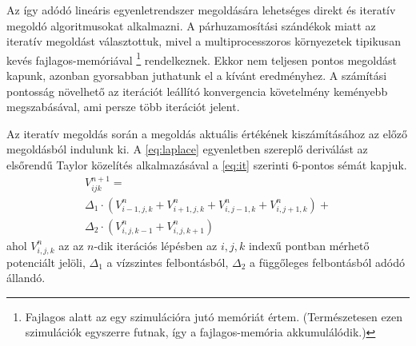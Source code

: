 	Az így adódó lineáris egyenletrendszer megoldására lehetséges direkt és iteratív megoldó
	algoritmusokat alkalmazni.
	A párhuzamosítási szándékok miatt az iteratív megoldást választottuk, mivel a multiprocesszoros
	környezetek tipikusan kevés fajlagos-memóriával \footnote{Fajlagos alatt az egy szimulációra jutó
	memóriát értem. (Természetesen ezen szimulációk egyszerre futnak, így a fajlagos-memória
	akkumulálódik.)} rendelkeznek.
	Ekkor nem teljesen pontos megoldást kapunk, azonban gyorsabban juthatunk el a kívánt eredményhez.
	A számítási pontosság növelhető az iterációt leállító konvergencia követelmény keményebb
	megszabásával, ami persze több iterációt jelent.
	
	Az iteratív megoldás során a megoldás aktuális értékének kiszámításához az előző megoldásból indulunk ki.
	A \eqref{eq:laplace} egyenletben szereplő deriválást az elsőrendű Taylor közelítés alkalmazásával a
	\eqref{eq:it} szerinti 6-pontos sémát kapjuk.
	\begin{multline} \label{eq:it} 
		V_{ijk}^{n+1} = \\ \Delta_1 \cdot \left(V_{i-1,j,k}^n+V_{i+1,j,k}^n
		+V_{i,j-1,k}^n+V_{i,j+1,k}^n\right)+ \\
						\Delta_2 \cdot \left(V_{i,j,k-1}^n+V_{i,j,k+1}^n\right)
	\end{multline}
	ahol $V_{i,j,k}^n$ az az $n$-dik iterációs lépésben az $i,j,k$ indexű
	pontban mérhető potenciált jelöli, $\Delta_1$ a vízszintes felbontásból,
	$\Delta_2$ a függőleges felbontásból adódó állandó.
	

